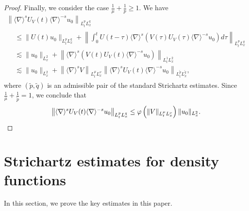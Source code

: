 \documentclass[10pt,a4paper]{amsart}
\providecommand{\No}[1]{\left\| #1 \right\|}
\newcommand{\ph}{\varphi}
\newcommand{\ta}{\tau}
\newcommand{\wt}{\widetilde}
\renewcommand{\No}[1]{\left\| #1 \right\|}
\newcommand{\sd}{\langle \nabla \rangle}
\newcommand{\ls}{\lesssim}
\begin{document}
\begin{proof}
Finally, we consider the case $\frac{1}{\mu}+\frac{1}{p} \ge 1$. We have
\begin{multline}
\left\|\sd^s U_V(t)\sd^{-s} u_0\right\|_{L^p_t L^q_x} \\
\begin{aligned}
&\le \|U(t)u_0\|_{L^p_t L^q_x} + \No{ \int_0^t U(t-\ta)\sd^s (V(\ta)U_V(\ta) \sd^{-s}u_0)d\ta }_{L^p_t L^q_x} \\
&\ls \|u_0\|_{L^2_x} + \left\|\sd^s (V(t)U_V(t)\sd^{-s}u_0)\right\|_{L^1_t L^2_x} \\
&\ls \|u_0\|_{L^2_x} + \left\|\sd^s V\right\|_{L^\mu_t L^\nu_x} \left\|\sd^s U_V(t)\sd^{-s} u_0\right\|_{L^{\wt{p}}_t L^{\wt{q}}_x},
\end{aligned}
\end{multline}
where $(\wt{p}, \wt{q})$ is an admissible pair of the standard Strichartz estimates. Since $\frac{1}{\mu}+\frac{1}{\wt{p}} = 1$, we conclude that
\begin{equation}
\left\|\sd^s U_V(t)\sd^{-s} u_0\right\|_{L^p_t L^q_x}
\le \ph\left(\|V\|_{L^\mu_t L^\nu_x}\right) \|u_0\|_{L^2_x}.\qedhere
\end{equation}
\end{proof}



\section{Strichartz estimates for density functions}\label{sect4}

In this section, we prove the key estimates in this paper.
\end{document}
